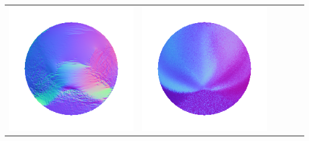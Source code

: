 \begin{center}
\begin{tabularx}{\linewidth}{@{}Y@{}Y@{}Y@{}Y@{}Y@{}Y@{}}
\includegraphics[width=\linewidth]{semisynthetic/20150514_13_yu_out.png} &
\includegraphics[width=\linewidth]{semisynthetic/20150514_13_dpsn_out.png} &

\end{tabularx}
\end{center}
